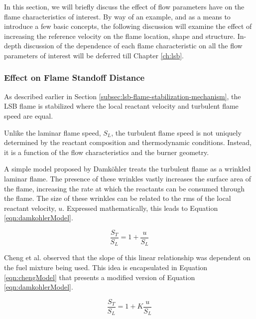 In this section, we will briefly discuss the effect of flow parameters have on the flame characteristics of interest.
By way of an example, and as a means to introduce a few basic concepts, the following discussion will examine the effect of increasing the reference velocity on the flame location, shape and structure.
In-depth discussion of the dependence of each flame characteristic on all the flow parameters of interest will be deferred till Chapter \ref{ch:lsb}.

\subsubsection{Effect on Flame Standoff Distance}
\label{subsubsec:flame-characteristics-standoff}

As described earlier in Section \ref{subsec:lsb-flame-stabilization-mechanism}, the LSB flame is stabilized where the local reactant velocity and turbulent flame speed are equal.

Unlike the laminar flame speed, \(S_L\), the turbulent flame speed is not uniquely determined by the reactant composition and thermodynamic conditions.
Instead, it is a function of the flow characteristics and the burner geometry.


A simple model proposed by Damk{\"o}hler\cite{1940-damkohler} treats the turbulent flame as a wrinkled laminar flame.
The presence of these wrinkles vastly increases the surface area of the flame, increasing the rate at which the reactants can be consumed through the flame.
The size of these wrinkles can be related to the rms of the local reactant velocity, \(u\).
Expressed mathematically, this leads to Equation \ref{eqn:damkohlerModel}.

\begin{equation}
\frac{ S_T }{ S_L } = 1 + \frac{ u }{ S_L }
\label{eqn:damkohlerModel}
\end{equation}


Cheng et al.\cite{2002-cheng,2009-cheng,2010-littlejohn} observed that the slope of this linear relationship was dependent on the fuel mixture being used.
This idea is encapsulated in Equation \ref{eqn:chengModel} that presents a modified version of Equation \ref{eqn:damkohlerModel}.

\begin{equation}
\frac{ S_T }{ S_L } = 1 + K \frac{ u }{ S_L }
\label{eqn:chengModel}
\end{equation}

